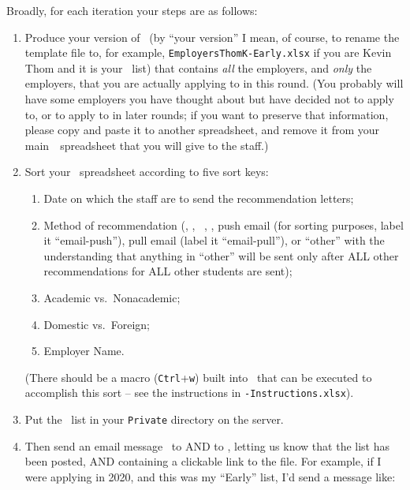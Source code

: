 \documentclass{\classes/econtex}
\newcommand\redout{\bgroup\markoverwith
  {\textcolor{red}{\rule[.5ex]{2pt}{1pt}}}\ULon}
\begin{document}
Broadly, for each iteration your steps are as follows:
\begin{enumerate}
\item Produce your version of \EMtt~(by ``your version'' I mean, of
  course, to rename the template file to, for example,
  \texttt{EmployersThomK-Early.xlsx} if you are Kevin Thom and it is
  your \Early~list) that contains \textit{all} the employers, and \textit{    only} the employers, that you are actually applying to in this
  round.  (You probably will have some employers you have thought
  about but have decided not to apply to, or to apply to in later rounds; if you want to preserve that
  information, please copy and paste it to another spreadsheet, and
  remove it from your main~{\EMW}~spreadsheet that you will give to the
  staff.)

\item Sort your \EMtt~spreadsheet according to five sort keys:
  \begin{enumerate} 
  \item Date on which the staff are to send the recommendation letters; 
  \item Method of recommendation (\AEA, \AJO, {\EJM}~, \Interfolio, push email (for sorting purposes,
    label it ``email-push''), pull email (label it ``email-pull''), or
    ``other'' with the understanding that anything in ``other'' will be
    sent only after ALL other recommendations for ALL other students are
    sent);
  \item Academic vs.\ Nonacademic;
  \item Domestic vs.\ Foreign;
  \item Employer Name. 
  \end{enumerate} 

  (There should be a macro (\texttt{Ctrl}+\texttt{w}) built into \EMtt~that can be
  executed to accomplish this sort -- see the instructions in
  \EMtt\texttt{-Instructions.xlsx}).

\item Put the {\EMtt}~list in your \texttt{Private} directory on the server.
  
\item Then send an email message \EMtt~to \jmstaffemail AND to \JMPOEmail, letting us know that the list has been posted, AND containing a clickable link to the file.  For example, if I were applying in 2020, and this was my ``Early'' list, I'd send a message like:


\end{enumerate}
\end{document}
